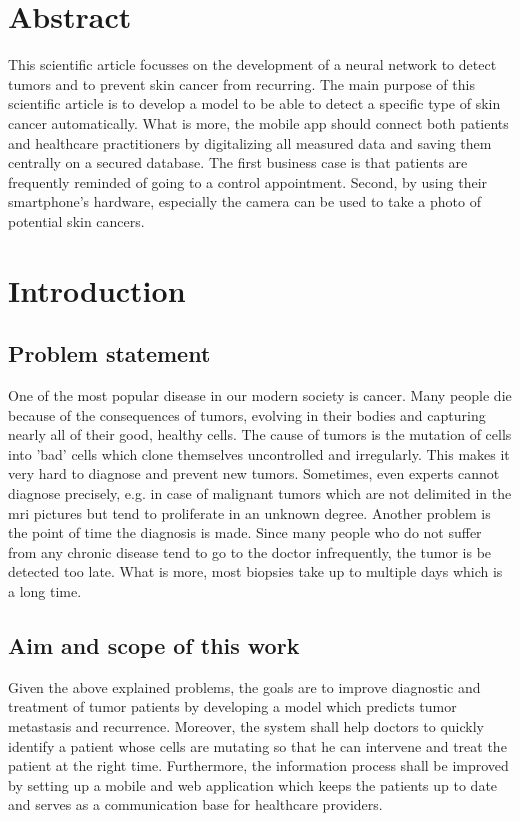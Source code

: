 



\chapter{Abstract}\label{abstract}

This scientific article focusses on the development of a neural network to detect tumors and to prevent skin cancer from recurring.
The main purpose of this scientific article is to develop a model to be able to detect a specific type of skin cancer automatically.
What is more, the mobile app should connect both patients and healthcare practitioners by digitalizing all measured data and saving them centrally on a secured database. 
The first business case is that patients are frequently reminded of going to a control appointment. 
Second, by using their smartphone's hardware, especially the camera can be used to take a photo of potential skin cancers. 

\chapter{Introduction}\label{introduction}

\section{Problem statement}

One of the most popular disease in our modern society is cancer. Many people die because of the consequences of tumors, evolving in their bodies and capturing nearly all of their good, healthy cells. The cause of tumors is the mutation of cells into 'bad' cells which clone themselves uncontrolled and irregularly. This makes it very hard to diagnose and prevent new tumors. Sometimes, even experts cannot diagnose precisely, e.g. in case of malignant tumors which are not delimited in the \ac{mri} pictures but tend to proliferate in an unknown degree. Another problem is the point of time the diagnosis is made. Since many people who do not suffer from any chronic disease tend to go to the doctor infrequently, the tumor is be detected too late. What is more, most biopsies take up to multiple days which is a long time.

\section{Aim and scope of this work}

Given the above explained problems, the goals are to improve diagnostic and treatment of tumor patients by developing a model which predicts tumor metastasis and recurrence. Moreover, the system shall help doctors to quickly identify a patient whose cells are mutating so that he can intervene and treat the patient at the right time. Furthermore, the information process shall be improved by setting up a mobile and web application which keeps the patients up to date and serves as a communication base for healthcare providers.

